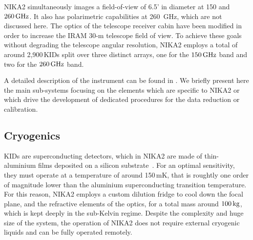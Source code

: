 
NIKA2 simultaneously images a field-of-view of
6.5' in diameter at 150 and $260\,\rm{GHz}$. It also has polarimetric
capabilities at 260~GHz, which are not discussed here. The optics of
the telescope receiver cabin have been modified in order
to increase the IRAM 30-m telescope field of view. To achieve these
goals without degrading the
telescope angular resolution, NIKA2 employs a total of around
2,900\,KIDs split over three distinct arrays, one for the $150\,\rm{GHz}$
band and two for the $260\,\rm{GHz}$ band.

A detailed description of the instrument can be found in
\citet{Adam2018}. We briefly present here the main sub-systems
focusing on the elements which are specific to NIKA2
or which drive the development of dedicated procedures for the data
reduction or calibration.


\subsection{Cryogenics}

{\lp KIDs are superconducting detectors, which in NIKA2 are made of
thin-aluminium films deposited on a silicon substrate~\citep{Roesch2012_LEKID}.
For an optimal sensitivity, they must operate at a temperature of
around 150\,mK, that is roughtly one order of magnitude lower than the
aluminium superconducting transition temperature.}  
For this reason,
NIKA2 employs a custom dilution fridge to cool down the focal plane, and the
refractive elements of the optics, for a total mass around $100\, \rm{kg}$,
which is kept deeply in the sub-Kelvin regime. Despite the complexity
and huge size of the system, the operation of NIKA2 does not require
external cryogenic liquids and can be fully operated remotely.


